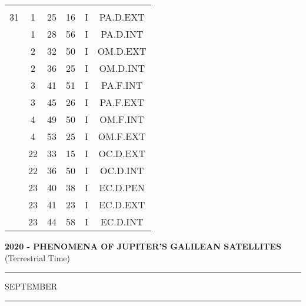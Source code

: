 \documentclass[12pt, a4paper]{article}
\begin{document}
\begin{multicols}{3}
{\begin{tabular}{c c c c c c}
	 	 	 	 & & & & & \\%
	 	 	 	31 & 1 & 25 & 16 & I & PA.D.EXT\\%
	 	 	 	 & 1 & 28 & 56 & I & PA.D.INT\\%
	 	 	 	 & 2 & 32 & 50 & I & OM.D.EXT\\%
	 	 	 	 & 2 & 36 & 25 & I & OM.D.INT\\%
	 	 	 	 & 3 & 41 & 51 & I & PA.F.INT\\%
	 	 	 	 & 3 & 45 & 26 & I & PA.F.EXT\\%
	 	 	 	 & 4 & 49 & 50 & I & OM.F.INT\\%
	 	 	 	 & 4 & 53 & 25 & I & OM.F.EXT\\%
	 	 	 	 & 22 & 33 & 15 & I & OC.D.EXT\\%
	 	 	 	 & 22 & 36 & 50 & I & OC.D.INT\\%
	 	 	 	 & 23 & 40 & 38 & I & EC.D.PEN\\%
	 	 	 	 & 23 & 41 & 23 & I & EC.D.EXT\\%
	 	 	 	 & 23 & 44 & 58 & I & EC.D.INT\\%
	 	 \end{tabular}
 	}
\end{multicols}
\textbf{2020 - PHENOMENA OF JUPITER'S GALILEAN SATELLITES}\\(Terrestrial Time) 
\vspace{0.1cm} \hrule \vspace{0.1cm}
SEPTEMBER\vspace{0.1cm}
\hrule
\vspace{-0.2cm}
\end{document}
